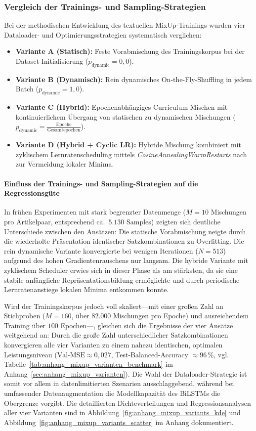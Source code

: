 \subsubsection{Vergleich der Trainings- und Sampling-Strategien}
Bei der methodischen Entwicklung des textuellen MixUp-Trainings wurden vier Dataloader- und Optimierungsstrategien systematisch verglichen:
\begin{itemize}
    \item \textbf{Variante A (Statisch):} Feste Vorabmischung des Trainingskorpus bei der Dataset-Initialisierung ($p_{\text{dynamic}} = 0{,}0$).
    \item \textbf{Variante B (Dynamisch):} Rein dynamisches On-the-Fly-Shuffling in jedem Batch ($p_{\text{dynamic}} = 1{,}0$).
    \item \textbf{Variante C (Hybrid):} Epochenabhängiges Curriculum-Mischen mit kontinuierlichem Übergang von statischen zu dynamischen Mischungen ($p_{\text{dynamic}} = \frac{\text{Epoche}}{\text{Gesamtepochen}}$).
    \item \textbf{Variante D (Hybrid + Cyclic LR):} Hybride Mischung kombiniert mit zyklischem Lernratenscheduling mittels \textit{CosineAnnealingWarmRestarts} nach \citet{loshchilov2016sgdr} zur Vermeidung lokaler Minima.
\end{itemize}

\paragraph{Einfluss der Trainings- und Sampling-Strategien auf die Regressionsgüte}
In frühen Experimenten mit stark begrenzter Datenmenge ($M = 10$ Mischungen pro Artikelpaar, entsprechend ca.~$5.130$ Samples) zeigten sich deutliche Unterschiede zwischen den Ansätzen: Die statische Vorabmischung neigte durch die wiederholte Präsentation identischer Satzkombinationen zu Overfitting. Die rein dynamische Variante konvergierte bei wenigen Iterationen ($N=513$) aufgrund des hohen Gradientenrauschens nur langsam. Die hybride Variante mit zyklischem Scheduler erwies sich in dieser Phase als am stärksten, da sie eine stabile anfängliche Repräsentationsbildung ermöglichte und durch periodische Lernratenanstiege lokalen Minima entkommen konnte.

Wird der Trainingskorpus jedoch voll skaliert---mit einer großen Zahl an Stichproben ($M = 160$, über $82.000$ Mischungen pro Epoche) und ausreichendem Training über $100$ Epochen---, gleichen sich die Ergebnisse der vier Ansätze weitgehend an: Durch die große Zahl unterschiedlicher Satzkombinationen konvergieren alle vier Varianten zu einem nahezu identischen, optimalen Leistungsniveau ($\text{Val-MSE} \approx 0{,}027$, Test-Balanced-Accuracy $\approx 96\,\%$, vgl. Tabelle~\ref{tab:anhang_mixup_varianten_benchmark} im Anhang~\ref{sec:anhang_mixup_varianten}). Die Wahl der Dataloader-Strategie ist somit vor allem in datenlimitierten Szenarien ausschlaggebend, während bei umfassender Datenaugmentation die Modellkapazität des BiLSTMs die Obergrenze vorgibt. Die detaillierten Dichteverteilungen und Regressionsanalysen aller vier Varianten sind in Abbildung~\ref{fig:anhang_mixup_variants_kde} und Abbildung~\ref{fig:anhang_mixup_variants_scatter} im Anhang dokumentiert.

